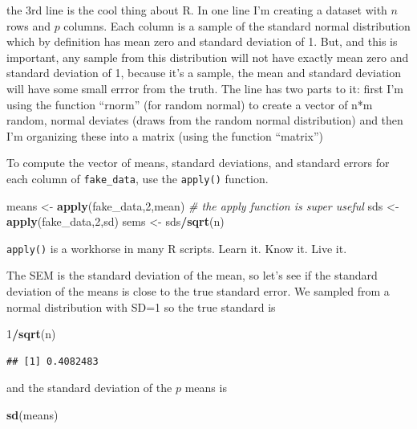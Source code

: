 \documentclass[]{book}
\newenvironment{Shaded}{\begin{snugshade}}{\end{snugshade}}
\newcommand{\KeywordTok}[1]{\textcolor[rgb]{0.13,0.29,0.53}{\textbf{#1}}}
\newcommand{\DecValTok}[1]{\textcolor[rgb]{0.00,0.00,0.81}{#1}}
\newcommand{\StringTok}[1]{\textcolor[rgb]{0.31,0.60,0.02}{#1}}
\newcommand{\CommentTok}[1]{\textcolor[rgb]{0.56,0.35,0.01}{\textit{#1}}}
\newcommand{\OperatorTok}[1]{\textcolor[rgb]{0.81,0.36,0.00}{\textbf{#1}}}
\newcommand{\NormalTok}[1]{#1}
\begin{document}
the 3rd line is the cool thing about R. In one line I'm creating a
dataset with \(n\) rows and \(p\) columns. Each column is a sample of
the standard normal distribution which by definition has mean zero and
standard deviation of 1. But, and this is important, any sample from
this distribution will not have exactly mean zero and standard deviation
of 1, because it's a sample, the mean and standard deviation will have
some small errror from the truth. The line has two parts to it: first
I'm using the function ``rnorm'' (for random normal) to create a vector
of n*m random, normal deviates (draws from the random normal
distribution) and then I'm organizing these into a matrix (using the
function ``matrix'')

To compute the vector of means, standard deviations, and standard errors
for each column of \texttt{fake\_data}, use the \texttt{apply()}
function.

\begin{Shaded}
\begin{Highlighting}[]
\NormalTok{means <-}\StringTok{ }\KeywordTok{apply}\NormalTok{(fake_data,}\DecValTok{2}\NormalTok{,mean) }\CommentTok{# the apply function is super useful}
\NormalTok{sds <-}\StringTok{ }\KeywordTok{apply}\NormalTok{(fake_data,}\DecValTok{2}\NormalTok{,sd)}
\NormalTok{sems <-}\StringTok{ }\NormalTok{sds}\OperatorTok{/}\KeywordTok{sqrt}\NormalTok{(n)}
\end{Highlighting}
\end{Shaded}

\texttt{apply()} is a workhorse in many R scripts. Learn it. Know it.
Live it.

The SEM is the standard deviation of the mean, so let's see if the
standard deviation of the means is close to the true standard error. We
sampled from a normal distribution with SD=1 so the true standard is

\begin{Shaded}
\begin{Highlighting}[]
\DecValTok{1}\OperatorTok{/}\KeywordTok{sqrt}\NormalTok{(n)}
\end{Highlighting}
\end{Shaded}

\begin{verbatim}
## [1] 0.4082483
\end{verbatim}

and the standard deviation of the \(p\) means is

\begin{Shaded}
\begin{Highlighting}[]
\KeywordTok{sd}\NormalTok{(means)}
\end{Highlighting}
\end{Shaded}
\end{document}
